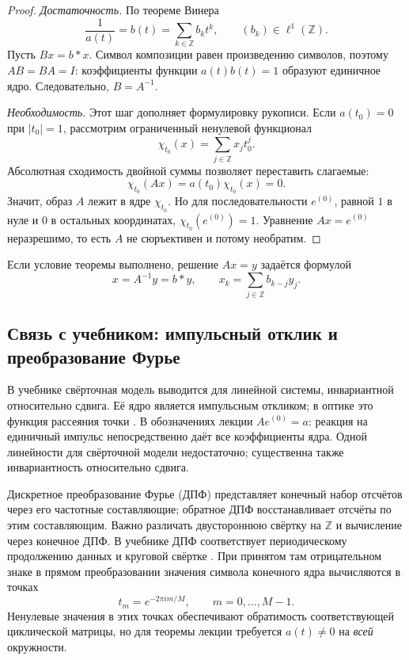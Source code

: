 \documentclass[12pt,a4paper]{article}
\theoremstyle{definition}
\theoremstyle{remark}
\newcommand{\ZZ}{\mathbb{Z}}
\begin{document}
\begin{proof}
\emph{Достаточность.} По теореме Винера
\[
  \frac1{a(t)}=b(t)=\sum_{k\in\ZZ}b_kt^k,\qquad (b_k)\in\ell^1(\ZZ).
\]
Пусть $Bx=b*x$. Символ композиции равен произведению символов,
поэтому $AB=BA=I$: коэффициенты функции $a(t)b(t)=1$ образуют
единичное ядро. Следовательно, $B=A^{-1}$.

\emph{Необходимость.} Этот шаг дополняет формулировку рукописи.
Если $a(t_0)=0$ при $|t_0|=1$, рассмотрим ограниченный ненулевой
функционал
\[
  \chi_{t_0}(x)=\sum_{j\in\ZZ}x_jt_0^j.
\]
Абсолютная сходимость двойной суммы позволяет переставить слагаемые:
\[
  \chi_{t_0}(Ax)=a(t_0)\chi_{t_0}(x)=0.
\]
Значит, образ $A$ лежит в ядре $\chi_{t_0}$. Но для последовательности
$e^{(0)}$, равной $1$ в нуле и $0$ в остальных координатах,
$\chi_{t_0}(e^{(0)})=1$. Уравнение $Ax=e^{(0)}$ неразрешимо,
то есть $A$ не сюръективен и потому необратим.
\end{proof}

Если условие теоремы выполнено, решение $Ax=y$ задаётся формулой
\[
  x=A^{-1}y=b*y,\qquad x_k=\sum_{j\in\ZZ}b_{k-j}y_j.
\]

\subsection{Связь с учебником: импульсный отклик и преобразование Фурье}

В учебнике свёрточная модель выводится для линейной системы,
инвариантной относительно сдвига. Её ядро является импульсным откликом;
в оптике это функция рассеяния точки
\cite[\S\,5.5, с.~403--406]{GW2012}. В обозначениях лекции
$Ae^{(0)}=a$: реакция на единичный импульс непосредственно даёт
все коэффициенты ядра. Одной линейности для свёрточной модели
недостаточно; существенна также инвариантность относительно сдвига.

Дискретное преобразование Фурье (ДПФ) представляет конечный набор
отсчётов через его частотные составляющие; обратное ДПФ восстанавливает
отсчёты по этим составляющим. Важно различать двустороннюю свёртку
на $\ZZ$ и вычисление через конечное ДПФ.
В учебнике ДПФ соответствует периодическому продолжению
данных и круговой свёртке \cite[\S\,4.4.1, с.~270]{GW2012}.
При принятом там отрицательном знаке в прямом преобразовании
значения символа конечного ядра вычисляются в точках
\[
  t_m=e^{-2\pi i m/M},\qquad m=0,\ldots,M-1.
\]
Ненулевые значения в этих точках обеспечивают обратимость
соответствующей циклической матрицы, но для теоремы лекции требуется
$a(t)\ne0$ на \emph{всей} окружности.
\end{document}
